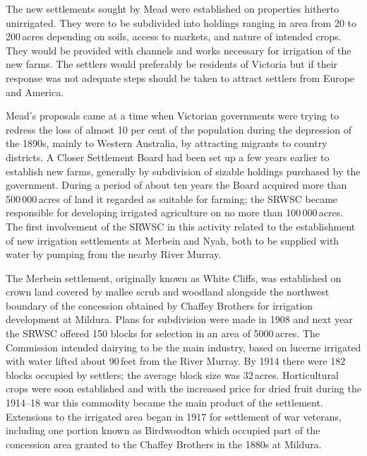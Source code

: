 The new settlements sought by Mead were established on properties
hitherto unirrigated. They were to be subdivided into holdings ranging
in area from 20 to 200\,acres depending on soils, access to markets, and
nature of intended crops.  They would be provided with channels and
works necessary for irrigation of the new farms.  The settlers would
preferably be residents of Victoria but if their response was not
adequate steps should be taken to attract settlers from Europe and
America.

Mead's proposals came at a time when Victorian governments were trying
to redress the loss of almost 10 per cent of the population during the
depression of the 1890s, mainly to Western Australia, by attracting
migrants to country districts.  A Closer Settlement Board had been set
up a few years earlier to establish new farms, generally by
subdivision of sizable holdings purchased by the government.  During a
period of about ten years the Board acquired more than 500\,000\,acres
of land it regarded as suitable for farming; the SRWSC became
responsible for developing irrigated agriculture on no more than
100\,000\,acres.  The first involvement of the SRWSC in this activity
related to the establishment of new irrigation settlements at Merbein
and Nyah,  both to be supplied
with water by pumping from the nearby River Murray.

The Merbein settlement, originally known as White Cliffs, was
established on crown land covered by mallee scrub and woodland
alongside the northwest boundary of the concession obtained by Chaffey
Brothers for irrigation development at Mildura.  Plans for subdivision
were made in 1908 and next year the SRWSC offered 150 blocks for
selection in an area of 5000\,acres.  The Commission intended dairying
to be the main industry, based on lucerne irrigated with water lifted
about 90\,feet from the River Murray.  By 1914 there were 182 blocks
occupied by settlers; the average block size was 32\,acres.
Horticultural crops were soon established and with the increased price
for dried fruit during the 1914--18 war this commodity became the main
product of the settlement.  Extensions to the irrigated area began in
1917 for settlement of war veterans, including one portion known as
Birdwoodton which occupied part of the concession area granted to the
Chaffey Brothers in the 1880s at Mildura.

